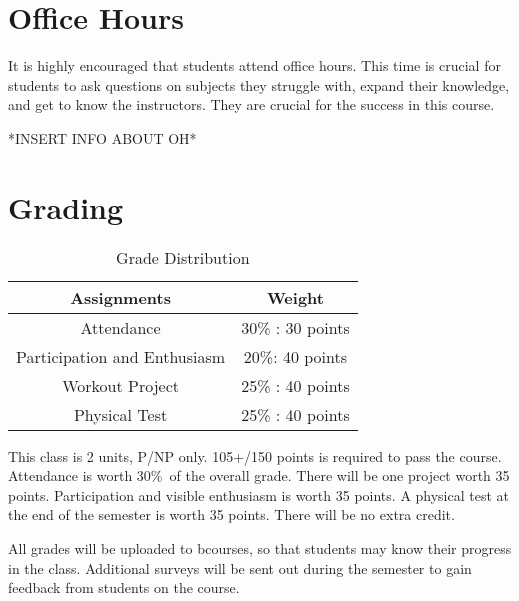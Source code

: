 \documentclass[letterpaper,12pt]{article}
\begin{document}
\section{Office Hours}
It is highly encouraged that students attend office hours. This time is crucial for students to ask questions on subjects they struggle with, expand their knowledge, and get to know the instructors. They are crucial for the success in this course.

*INSERT INFO ABOUT OH*

\section{Grading}
\begin{table}[ht]
\begin{center}
\caption{Grade Distribution}
\label{tbl:bins} %
\begin{tabular}{|cc|}
\hline
\multicolumn{1}{|c}{Assignments} & \multicolumn{1}{c|}{Weight} \\
\hline
Attendance &   30\% : 30 points \\
Participation and Enthusiasm &   20\%: 40 points \\
Workout Project &   25\% : 40 points \\
Physical Test &  25\% : 40 points \\
\hline
\end{tabular}
\end{center}
\end{table}

This class is 2 units, P/NP only. 105+/150 points is required to pass the course.   Attendance is worth 30\%\ of the overall grade. There will be one project worth 35 points. Participation and visible enthusiasm is worth 35 points. A physical test at the end of the semester is worth 35 points. There will be no extra credit.

All grades will be uploaded to bcourses, so that students may know their progress in the class. Additional surveys will be sent out during the semester to gain feedback from students on the course.
\end{document}
